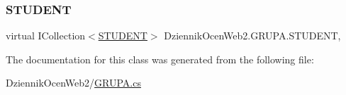 \subsubsection{\texorpdfstring{S\+T\+U\+D\+E\+NT}{STUDENT}}
{\footnotesize\ttfamily virtual I\+Collection$<$\hyperlink{class_dziennik_ocen_web2_1_1_s_t_u_d_e_n_t}{S\+T\+U\+D\+E\+NT}$>$ Dziennik\+Ocen\+Web2.\+G\+R\+U\+P\+A.\+S\+T\+U\+D\+E\+NT\hspace{0.3cm}{\ttfamily [get]}, {\ttfamily [set]}}



The documentation for this class was generated from the following file\+:\begin{DoxyCompactItemize}
\item 
Dziennik\+Ocen\+Web2/\hyperlink{_g_r_u_p_a_8cs}{G\+R\+U\+P\+A.\+cs}\end{DoxyCompactItemize}
